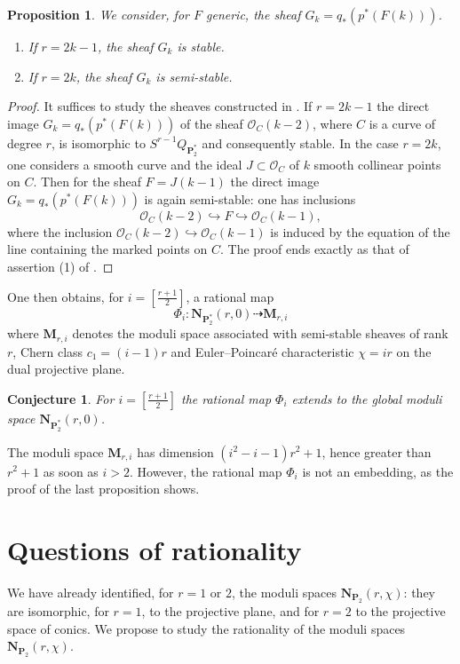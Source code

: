 \documentclass[12pt,english]{smfart}%
\theoremstyle{plain}
\newtheorem{proposition}[theorem]{Proposition}
\newtheorem{conjecture}[theorem]{Conjecture}
\theoremstyle{definition}
\theoremstyle{remark}
\newcommand{\PP}{\mathbf{P}}
\newcommand{\Pd}{\PP_{2}^{*}}          %
\newcommand{\NN}{\mathbf{N}}           %
\newcommand{\MM}{\mathbf{M}}           %
\newcommand{\Oo}{\mathcal{O}}
\newcommand{\origpage}[1]{\marginnote{\scriptsize\itshape p.~#1}}
\begin{document}
\begin{proposition}\label{prop:Gk}
We consider, for $F$ generic, the sheaf $G_k = q_*(p^*(F(k)))$.
\begin{enumerate}
\item[(1)] If $r=2k-1$, the sheaf $G_k$ is stable.
\item[(2)] If $r=2k$, the sheaf $G_k$ is semi-stable.
\end{enumerate}
\end{proposition}

\begin{proof}
It suffices to study the sheaves constructed in . If $r=2k-1$ the direct image $G_k = q_*(p^*(F(k)))$ of the sheaf $\Oo_C(k-2)$, where $C$ is a curve of degree $r$, is isomorphic to $S^{r-1}Q_{\Pd}$ and consequently
\origpage{670}%
stable. In the case $r=2k$, one considers a smooth curve and the ideal $J\subset\Oo_C$ of $k$ smooth collinear points on $C$. Then for the sheaf $F=J(k-1)$ the direct image $G_k = q_*(p^*(F(k)))$ is again semi-stable: one has inclusions
\[
\Oo_C(k-2)\hookrightarrow F\hookrightarrow \Oo_C(k-1),
\]
where the inclusion $\Oo_C(k-2)\hookrightarrow \Oo_C(k-1)$ is induced by the equation of the line containing the marked points on $C$. The proof ends exactly as that of assertion (1) of .
\end{proof}

One then obtains, for $i=\left[\frac{r+1}{2}\right]$, a rational map
\[
\Phi_i : \NN_{\Pd}(r,0)\dashrightarrow \MM_{r,i}
\]
where $\MM_{r,i}$ denotes the moduli space associated with semi-stable sheaves of rank $r$, Chern class $c_1=(i-1)r$ and Euler--Poincar\'e characteristic $\chi=ir$ on the dual projective plane.

\begin{conjecture}\label{conj:Phi-i}
For $i=\left[\frac{r+1}{2}\right]$ the rational map $\Phi_i$ extends to the global moduli space $\NN_{\Pd}(r,0)$.
\end{conjecture}

The moduli space $\MM_{r,i}$ has dimension $(i^2-i-1)r^2+1$, hence greater than $r^2+1$ as soon as $i>2$. However, the rational map $\Phi_i$ is not an embedding, as the proof of the last proposition shows.

\section{Questions of rationality}\label{sec:rationality}

We have already identified, for $r=1$ or $2$, the moduli spaces $\NN_{\PP_2}(r,\chi)$: they are isomorphic, for $r=1$, to the projective plane, and for $r=2$ to the projective space of conics. We propose to study the rationality of the moduli spaces $\NN_{\PP_2}(r,\chi)$.
\end{document}
